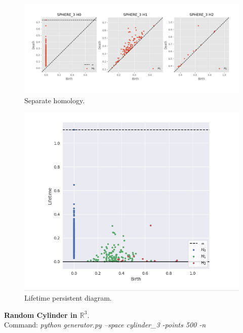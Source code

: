 \documentclass[11pt,a4paper]{report}
\begin{document}
              \begin{figure}[H]
                \centering
                \includegraphics[width=\linewidth]{./ripser/rand_sphere_homology_seperate.PNG}
                \caption{Separate homology.}
                \label{fig:sep hom}
              \end{figure}

              \begin{figure}[H]
                \centering
                \includegraphics[width=0.5\linewidth, scale=0.5]{./ripser/rand_sphere_lifetime.PNG}
                \caption{Lifetime persistent diagram.}
                \label{fig:sep hom}
              \end{figure}

              \textbf{Random Cylinder in $\mathbb{R}^3$}.\\
              Command: \textit{python generator.py --space cylinder\_3 -points 500 -n}
\end{document}

